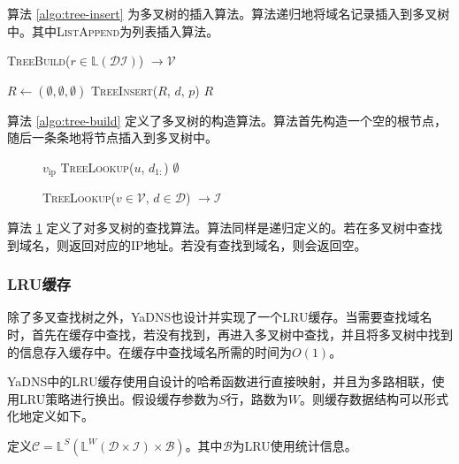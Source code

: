 算法 \ref{algo:tree-insert} 为多叉树的插入算法。算法递归地将域名记录插入到多叉树中。其中\textsc{ListAppend}为列表插入算法。

\begin{algorithm}[h]
\caption{\textsc{TreeBuild}($r \in \mathds L(\mathcal D \mathcal I)$) $\rightarrow \mathcal V$}
\label{algo:tree-build}
$R \gets (\emptyset, \emptyset, \emptyset)$\;
 {
  \textsc{TreeInsert}($R$, $d$, $p$)\;
}
\Return $R$\;
\end{algorithm}

算法 \ref{algo:tree-build} 定义了多叉树的构造算法。算法首先构造一个空的根节点，随后一条条地将节点插入到多叉树中。

\begin{figure}
\begin{minipage}{0.57\textwidth}
\begin{algorithm}[H]
\caption{\textsc{TreeLookup}($v \in \mathcal V$, $d \in \mathcal D$) $\rightarrow \mathcal I$}
\label{algo:tree-lookup}
 {
  \Return $v_{\text{ip}}$\;
}
 {
   {
    \Return \textsc{TreeLookup}($u$, $d_{1:}$)\;
  }
}
\Return $\emptyset$\;
\end{algorithm}
\end{minipage}
\end{figure}

算法 \ref{algo:tree-lookup} 定义了对多叉树的查找算法。算法同样是递归定义的。若在多叉树中查找到域名，则返回对应的IP地址。若没有查找到域名，则会返回空。

\subsubsection{LRU缓存}

除了多叉查找树之外，YaDNS也设计并实现了一个LRU缓存。当需要查找域名时，首先在缓存中查找，若没有找到，再进入多叉树中查找，并且将多叉树中找到的信息存入缓存中。在缓存中查找域名所需的时间为$O(1)$。

YaDNS中的LRU缓存使用自设计的哈希函数进行直接映射，并且为多路相联，使用LRU策略进行换出。假设缓存参数为$S$行，路数为$W$。则缓存数据结构可以形式化地定义如下。

\begin{definition}[LRU缓存]
定义$\mathcal C = \mathds L^S (\mathds L^W(\mathcal D \times \mathcal I) \times \mathcal B)$。其中$\mathcal B$为LRU使用统计信息。
\end{definition}

